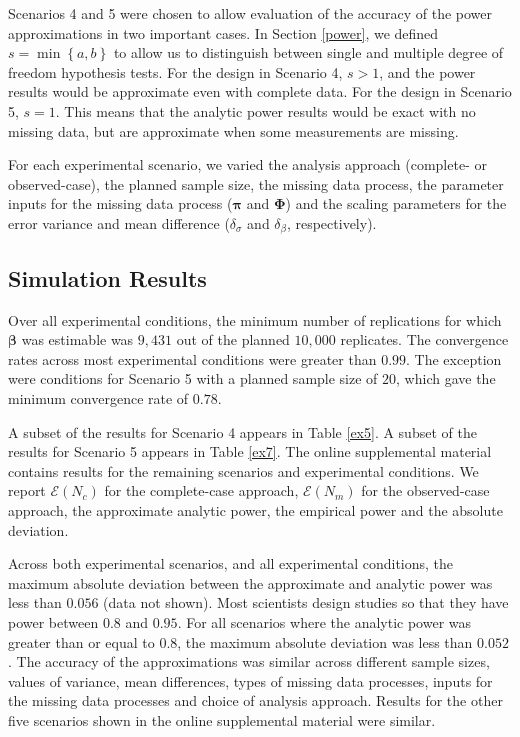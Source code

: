 \documentclass[11pt]{article}
\begin{document}
Scenarios 4 and 5 were chosen to allow evaluation of the accuracy of the power approximations in two important cases. In Section \ref{power}, we defined $s=\min\left\{a,b\right\}$ to allow us to distinguish between single and multiple degree of freedom hypothesis tests. For the design in Scenario 4, $s>1$, and the power results would be approximate even with complete data. For the design in Scenario 5, $s=1$. This means that the analytic power results would be exact with no missing data, but are approximate when some measurements are missing.

For each experimental scenario, we varied the analysis approach (complete- or observed-case), the planned sample size, the missing data process, the parameter inputs for the missing data process ($\boldsymbol{\pi}$ and $\boldsymbol{\Phi}$) and the scaling parameters for the error variance and mean difference ($\delta_{\sigma}$ and $\delta_{\beta}$, respectively).

\subsection{Simulation Results}

Over all experimental conditions, the minimum number of replications for which $\boldsymbol{\beta}$ was estimable was $9,431$ out of the planned $10,000$ replicates. The convergence rates across most experimental conditions were greater than $0.99$. The exception were conditions for Scenario 5 with a planned sample size of $20$, which gave the minimum convergence rate of $0.78$.

A subset of the results for Scenario 4 appears in Table \ref{ex5}. A subset of the results for Scenario 5 appears in Table \ref{ex7}. The online supplemental material contains results for the remaining scenarios and experimental conditions. We report $\mathcal{E}\left(N_{c}\right)$ for the complete-case approach, $\mathcal{E}\left(N_{m}\right)$ for the observed-case approach, the approximate analytic power, the empirical power and the absolute deviation.

Across both experimental scenarios, and all experimental conditions, the maximum absolute deviation between the approximate and analytic power was less than $0.056$ (data not shown). Most scientists design studies so that they have power between $0.8$ and $0.95$. For all scenarios where the analytic power was greater than or equal to $0.8$, the maximum absolute deviation was less than $0.052$. The accuracy of the approximations was similar across different sample sizes, values of variance, mean differences, types of missing data processes, inputs for the missing data processes and choice of analysis approach. Results for the other five scenarios shown in the online supplemental material were similar.
\end{document}
